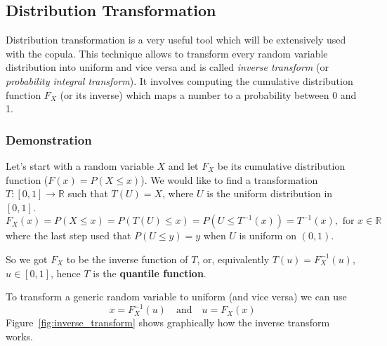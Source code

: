 
\subsection{Distribution Transformation}
\label{distribution-transformation}

Distribution transformation is a very useful tool which will be extensively used with the copula. This technique allows to transform every random variable distribution into uniform and vice versa and is called \emph{inverse transform} (or \emph{probability integral transform}).
It involves computing the cumulative distribution function $F_{X}$ (or its inverse) which maps a number to a probability between 0 and 1. 

\begin{attention}
\subsubsection{Demonstration}
Let's start with a random variable $X$ and let $F_X$ be its cumulative distribution function (\(F(x) = P(X \leq x)\)). 
We would like to find a transformation $T:[0,1]\rightarrow\mathbb{R}$ such that $T(U)=X$, where $U$ is the uniform distribution in $[0,1]$. 
\begin{equation*}
F_X(x)= P(X\leq x)=P(T(U)\leq x)= P(U\leq T^{-1}(x))=T^{-1}(x),{\text{ for }}x\in \mathbb {R}
\end{equation*}
where the last step used that $P(U\leq y)=y$ when $U$ is uniform on $(0,1)$.

So we got $F_{X}$ to be the inverse function of $T$, or, equivalently $T(u)=F_{X}^{-1}(u)$, $u\in [0,1]$, hence $T$ is the \textbf{quantile function}.
\end{attention}

To transform a generic random variable to uniform (and vice versa) we can use
\begin{equation}
x = F_{X}^{-1}(u)\quad\mathrm{and}\quad u = F_X(x)	
\end{equation} 
\noindent Figure~\ref{fig:inverse_transform} shows graphically how the inverse transform works.

